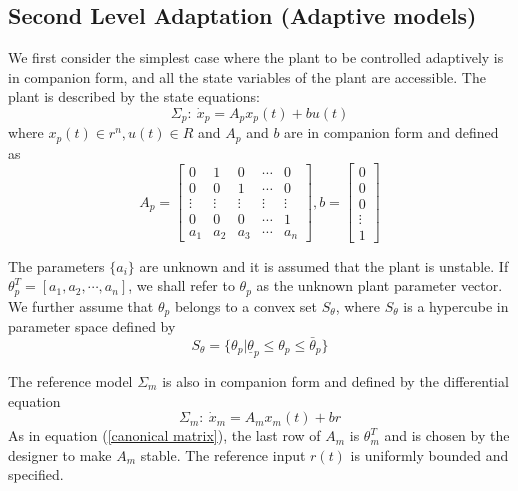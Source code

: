 \documentclass[conference]{IEEEtran}
\begin{document}
\subsection{Second Level Adaptation (Adaptive models)}
We first consider the simplest case where the plant to be controlled adaptively is in companion form, and all the state variables of the plant are accessible. The plant is described by the state equations:
\begin{equation}
\label{basic system model}
\Sigma_{p}:\ \dot{x}_{p}=A_{p}x_{p}(t)+bu(t)
\end{equation}
where $x_{p}(t)\in r^{n},u(t)\in R$ and $A_{p}$ and $b$ are in companion form and defined as
\begin{equation}
\label{canonical matrix}
A_{p}=\left[\begin{array}{lllll}0 & 1 & 0 & \cdots & 0\\0 & 0 & 1 & \cdots & 0\\ \vdots & \vdots & \vdots & \vdots & \vdots\\ 0 & 0 & 0 & \cdots & 1\\a_{1} & a_{2} & a_{3} & \cdots & a_{n}\end{array}\right], b=\left[\begin{array}{l}0\\0\\0\\\vdots \\1\end{array}\right]
\end{equation}

The parameters $\{a_{i}\}$ are unknown and it is assumed that the plant is unstable. If $\theta_{p}^{T}=[a_{1},a_{2},\cdots,a_{n}]$, we shall refer to $\theta_{p}$ as the unknown plant parameter vector. We further assume that $\theta_{p}$ belongs to a convex set $S_{\theta}$, where $S_{\theta}$ is a hypercube in parameter space defined by
\begin{equation}
\label{hypercubic}
S_{\theta}=\{\theta_{p}|\underline{\theta}_{p}\leq \theta_{p}\leq \bar{\theta}_{p}\}
\end{equation}

The reference model $\Sigma_{m}$ is also in companion form and defined by the differential equation
\begin{equation}
\label{basic reference model}
\Sigma_{m}:\ \dot{x}_{m}=A_{m}x_{m}(t)+br
\end{equation}
As in equation (\ref{canonical matrix}), the last row of $A_{m}$ is $\theta_{m}^{T}$ and is chosen by the designer to make $A_{m}$ stable. The reference input $r(t)$ is uniformly bounded and specified.
\end{document}
